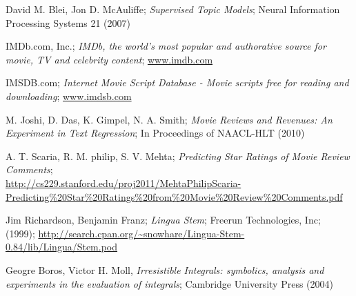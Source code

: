 \documentclass{article} %
\begin{document}
\vspace*{-3\baselineskip}
\renewcommand{\refname}{\subsubsection*{References}} %
\begin{thebibliography}{9}
  David M. Blei, Jon D. McAuliffe;
  \emph{Supervised Topic Models};
  Neural Information Processing Systems 21 (2007)
  
  IMDb.com, Inc.; 
  \emph{IMDb, the world's most popular and authorative source for movie, TV and celebrity content};
  \url{www.imdb.com}
  
  IMSDB.com; 
  \emph{Internet Movie Script Database - Movie scripts free for reading and downloading};
  \url{www.imdsb.com}

  M. Joshi, D. Das, K. Gimpel, N. A. Smith;
  \emph{Movie Reviews and Revenues: An Experiment in Text Regression};
  In Proceedings of NAACL-HLT (2010)

  A. T. Scaria, R. M. philip, S. V. Mehta;
  \emph{Predicting Star Ratings of Movie Review Comments};\\
  \url{http://cs229.stanford.edu/proj2011/MehtaPhilipScaria-Predicting\%20Star\%20Ratings\%20from\%20Movie\%20Review\%20Comments.pdf}
  
  Jim Richardson, Benjamin Franz;
  \emph{Lingua Stem};
  Freerun Technologies, Inc; (1999);
  \url{http://search.cpan.org/~snowhare/Lingua-Stem-0.84/lib/Lingua/Stem.pod}

  Geogre Boros, Victor H. Moll,
  \emph{Irresistible Integrals: symbolics, analysis and experiments in the evaluation of integrals};
  Cambridge University Press (2004)

\end{thebibliography}
\end{document}
